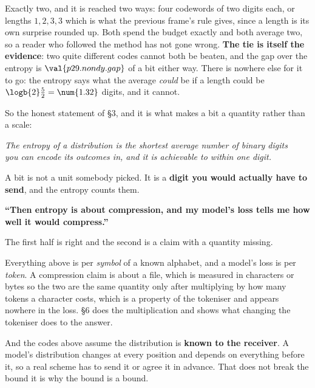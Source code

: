 \begin{fr}

Exactly two, and it is reached two ways: four codewords of two digits each,
or lengths $1, 2, 3, 3$ \dash{} which is what the previous frame's rule gives,
since a length is its own surprise rounded up. Both spend the budget exactly
and both average two, so a reader who followed the method has not gone wrong.
\textbf{The tie is itself the evidence}: two quite different codes cannot both
be beaten, and the gap over the entropy is $\val{p29.nondy.gap}$ of a bit
either way. There is nowhere else for it to go: the
entropy says what the average \emph{could} be if a length could be
$\logb{2} \frac{5}{2} = \num{1.32}$ digits, and it cannot.

So the honest statement of §3, and it is what makes a bit a quantity rather
than a scale:

\begin{center}
\emph{The entropy of a distribution is the shortest average number of binary
digits\\
you can encode its outcomes in, and it is achievable to within one digit.}
\end{center}

A bit is not a unit somebody picked. It is a \textbf{digit you would actually
have to send}, and the entropy counts them.
\end{fr}

\begin{fr}
\begin{trapbox}
\textbf{\enquote{Then entropy is about compression, and my model's loss tells
me how well it would compress.}}

The first half is right and the second is a claim with a quantity missing.

Everything above is per \emph{symbol} of a known alphabet, and a model's loss
is per \emph{token}. A compression claim is about a file, which is measured in
characters or bytes \dash{} so the two are the same quantity only after
multiplying by how many tokens a character costs, which is a property of the
tokeniser and appears nowhere in the loss. §6 does the multiplication and
shows what changing the tokeniser does to the answer.

And the codes above assume the distribution is \textbf{known to the receiver}.
A model's distribution changes at every position and depends on everything
before it, so a real scheme has to send it or agree it in advance. That does
not break the bound \dash{} it is why the bound is a bound.
\end{trapbox}
\end{fr}


